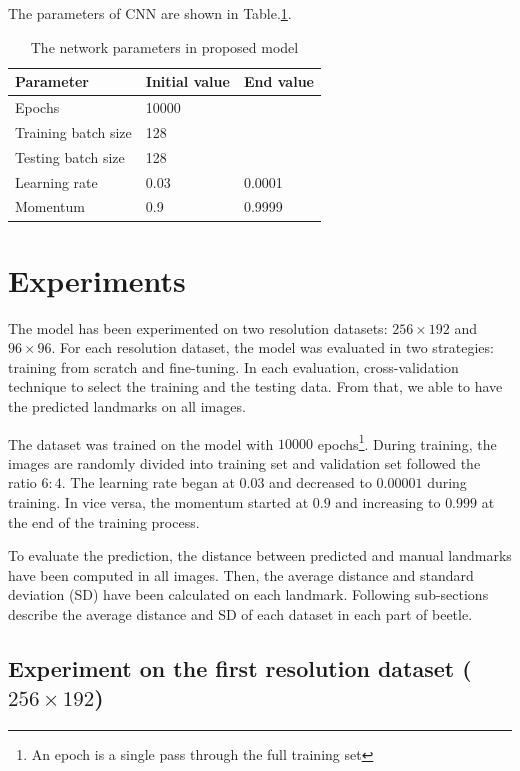 \documentclass[12pt,a4paper]{article}
\begin{document}
The parameters of CNN are shown in Table.\ref{model2parameters}.
\begin{table}[h!]
	\centering
	\begin{tabular}{l l l}
	Parameter & Initial value & End value \\ \hline
	Epochs & 10000 &  \\ \hline
	Training batch size & 128 & \\ \hline
	Testing batch size & 128 & \\ \hline
	Learning rate & 0.03 & 0.0001 \\ \hline
	Momentum & 0.9 & 0.9999 \\ \hline
	\end{tabular}
	\caption{The network parameters in proposed model}
	\label{model2parameters}
\end{table}
\section{Experiments}
The model has been experimented on two resolution datasets: $256 \times 192$ and $96 \times 96$. For each resolution dataset, the model was evaluated in two strategies: training from scratch and fine-tuning. In each evaluation, cross-validation technique to select the training and the testing data. From that, we able to have the predicted landmarks on all images.

The dataset was trained on the model with $10000$ epochs\footnote{An epoch is a single pass through the full training set}. During training, the images are randomly divided into training set and validation set followed the ratio $6:4$. The learning rate began at $0.03$ and decreased to $0.00001$ during training. In vice versa, the momentum started at $0.9$ and increasing to $0.999$ at the end of the training process. 

To evaluate the prediction, the distance between predicted and manual landmarks have been computed in all images. Then, the average distance and standard deviation (SD) have been calculated on each landmark. Following sub-sections describe the average distance and SD of each dataset in each part of beetle.
\subsection{Experiment on the first resolution dataset ($256 \times 192$) }
\end{document}
